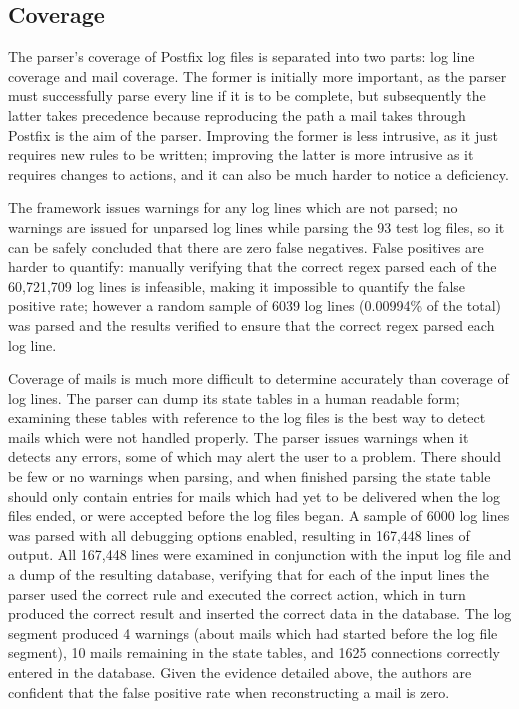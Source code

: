 \documentclass[draft]{svmult}
\newcommand{\numberOFlogFILES}[0]{%
    93%
}
\begin{document}
\subsection{Coverage}

\label{coverage}

The parser's coverage of Postfix log files is separated into two parts: log
line coverage and mail coverage.  The former is initially more important,
as the parser must successfully parse every line if it is to be complete,
but subsequently the latter takes precedence because reproducing the path a
mail takes through Postfix is the aim of the parser.  Improving the former
is less intrusive, as it just requires new rules to be written; improving
the latter is more intrusive as it requires changes to actions, and it can
also be much harder to notice a deficiency.

The framework issues warnings for any log lines which are not parsed; no
warnings are issued for unparsed log lines while parsing the
\numberOFlogFILES{} test log files, so it can be safely concluded that
there are zero false negatives.  False positives are harder to quantify:
manually verifying that the correct regex parsed each of the 60,721,709 log
lines is infeasible, making it impossible to quantify the false positive
rate; however a random sample of 6039 log lines (0.00994\% of the total)
was parsed and the results verified to ensure that the correct regex parsed
each log line.

Coverage of mails is much more difficult to determine accurately than
coverage of log lines.  The parser can dump its state tables in a human
readable form; examining these tables with reference to the log files is
the best way to detect mails which were not handled properly.  The parser
issues warnings when it detects any errors, some of which may alert the
user to a problem.  There should be few or no warnings when parsing, and
when finished parsing the state table should only contain entries for mails
which had yet to be delivered when the log files ended, or were accepted
before the log files began.  A sample of 6000 log lines was parsed with all
debugging options enabled, resulting in 167,448 lines of output.  All
167,448 lines were examined in conjunction with the input log file and a
dump of the resulting database, verifying that for each of the input lines
the parser used the correct rule and executed the correct action, which in
turn produced the correct result and inserted the correct data in the
database.  The log segment produced 4 warnings (about mails which had
started before the log file segment), 10 mails remaining in the state
tables, and 1625 connections correctly entered in the database.  Given the
evidence detailed above, the authors are confident that the false positive
rate when reconstructing a mail is zero.
\end{document}
